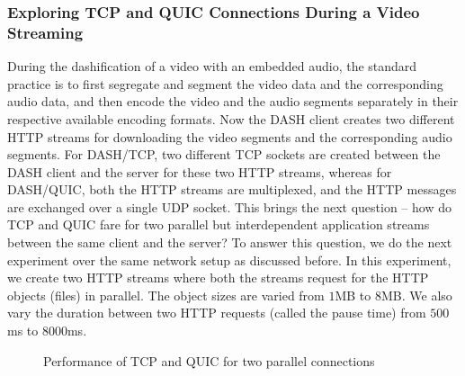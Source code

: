\subsubsection{Exploring TCP and QUIC Connections During a Video Streaming}
During the dashification of a video with an embedded audio, the standard practice is to first segregate and segment the video data and the corresponding audio data, and then encode the video and the audio segments separately in their respective available encoding formats.
Now the \ac{DASH} client creates two different \ac{HTTP} streams for downloading the video segments and the corresponding audio segments. For DASH/TCP, two different \ac{TCP} sockets are created between the \ac{DASH} client and the server for these two \ac{HTTP} streams, whereas for DASH/QUIC, both the \ac{HTTP} streams are multiplexed, and the HTTP messages are exchanged over a single \ac{UDP} socket.
This brings the next question -- how do \ac{TCP} and \ac{QUIC} fare for two parallel but interdependent application streams between the same client and the server?  To answer this question, we do the next experiment over the same network setup as discussed before. In this experiment, we create two HTTP streams where both the streams request for the HTTP objects (files) in parallel. The object sizes are varied from $1$MB to $8$MB.
We also vary the duration between two \ac{HTTP} requests (called the pause time) from $500$ms to $8000$ms.

\begin{figure}[!ht]
	\captionsetup[subfigure]{}
	\begin{center}
	\end{center}
	\caption{\label{fig:chap03s2:proofUhoodM}Performance of \acs{TCP} and \acs{QUIC} for two parallel connections}
\end{figure}


